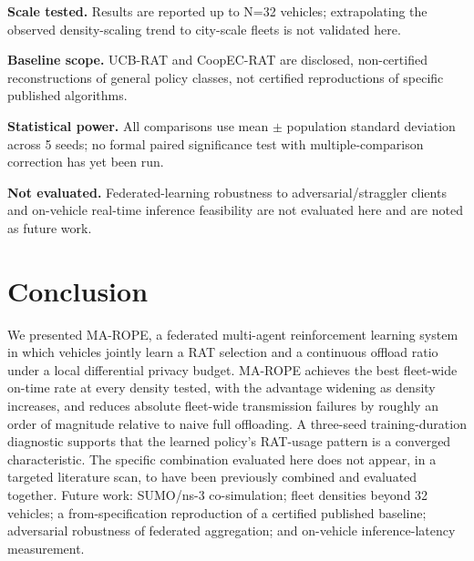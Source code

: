 \documentclass[journal,10pt,twocolumn]{IEEEtran}
\begin{document}
\textbf{Scale tested.} Results are reported up to N=32 vehicles; extrapolating the observed
density-scaling trend to city-scale fleets is not validated here.

\textbf{Baseline scope.} UCB-RAT and CoopEC-RAT are disclosed, non-certified reconstructions of
general policy classes, not certified reproductions of specific published algorithms.

\textbf{Statistical power.} All comparisons use mean $\pm$ population standard deviation across 5
seeds; no formal paired significance test with multiple-comparison correction has yet been run.

\textbf{Not evaluated.} Federated-learning robustness to adversarial/straggler clients and
on-vehicle real-time inference feasibility are not evaluated here and are noted as future work.

\section{Conclusion}
We presented MA-ROPE, a federated multi-agent reinforcement learning system in which vehicles
jointly learn a RAT selection and a continuous offload ratio under a local differential privacy
budget. MA-ROPE achieves the best fleet-wide on-time rate at every density tested, with the
advantage widening as density increases, and reduces absolute fleet-wide transmission failures by
roughly an order of magnitude relative to naive full offloading. A three-seed training-duration
diagnostic supports that the learned policy's RAT-usage pattern is a converged characteristic. The
specific combination evaluated here does not appear, in a targeted literature scan, to have been
previously combined and evaluated together. Future work: SUMO/ns-3 co-simulation; fleet densities
beyond 32 vehicles; a from-specification reproduction of a certified published baseline;
adversarial robustness of federated aggregation; and on-vehicle inference-latency measurement.



\end{document}

